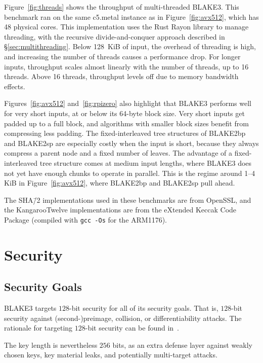 \documentclass[11pt,notitlepage,a4paper]{article}
\begin{document}
Figure~\ref{fig:threads} shows the throughput of multi-threaded BLAKE3. This
benchmark ran on the same c5.metal instance as in Figure~\ref{fig:avx512},
which has 48 physical cores. This implementation uses the Rust Rayon library to
manage threading, with the recursive divide-and-conquer approach described in
\S\ref{sec:multithreading}. Below 128~KiB of input, the overhead of threading
is high, and increasing the number of threads causes a performance drop. For
longer inputs, throughput scales almost linearly with the number of threads, up
to 16 threads. Above 16 threads, throughput levels off due to memory bandwidth
effects.

Figures~\ref{fig:avx512} and~\ref{fig:rpizero} also highlight that BLAKE3
performs well for very short inputs, at or below its 64-byte block size. Very
short inputs get padded up to a full block, and algorithms with smaller block
sizes benefit from compressing less padding. The fixed-interleaved tree
structures of BLAKE2bp and BLAKE2sp are especially costly when the input is
short, because they always compress a parent node and a fixed number of leaves.
The advantage of a fixed-interleaved tree structure comes at medium input
lengths, where BLAKE3 does not yet have enough chunks to operate in parallel.
This is the regime around 1--4\,KiB in Figure~\ref{fig:avx512}, where BLAKE2bp
and BLAKE2sp pull ahead.

The SHA\=/2 implementations used in these benchmarks are from OpenSSL, and the
KangarooTwelve implementations are from the eXtended Keccak Code Package
(compiled with \texttt{gcc -Os} for the ARM1176).

\section{Security}\label{sec:security}

\subsection{Security Goals}\label{sec:goals}

BLAKE3 targets $128$-bit security for all of its security goals. That
is, $128$-bit security against (second-)preimage, collision, or
differentiability attacks. 
The rationale for targeting $128$-bit security can be found
in~\cite[\S2]{TMC}.

The key length is nevertheless $256$ bits, as an extra defense layer
against weakly chosen keys, key material leaks, and potentially
multi-target attacks.
\end{document}
